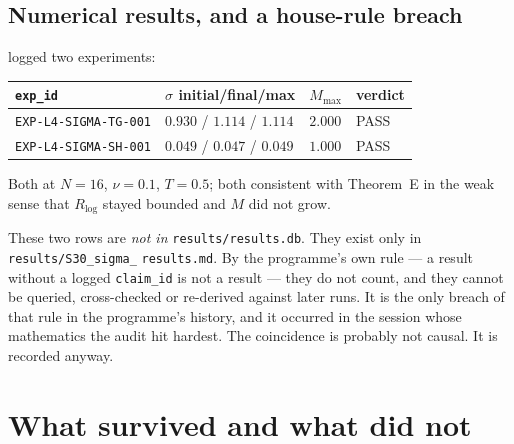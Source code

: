 \subsection{Numerical results, and a house-rule breach}

 logged two experiments:

\begin{center}
\small
\begin{tabular}{@{}l l l l@{}}
\toprule
\texttt{exp\_id} & \(\sigma\) initial/final/max & \(M_{\max}\) & verdict \\
\midrule
\texttt{EXP-L4-SIGMA-TG-001} & \(0.930\) / \(1.114\) / \(1.114\) & \(2.000\) & \textsf{PASS} \\
\texttt{EXP-L4-SIGMA-SH-001} & \(0.049\) / \(0.047\) / \(0.049\) & \(1.000\) & \textsf{PASS} \\
\bottomrule
\end{tabular}
\end{center}

\medskip
Both at \(N=16\), \(\nu=0.1\), \(T=0.5\); both consistent with Theorem~E in
the weak sense that \(R_{\log}\) stayed bounded and \(M\) did not grow.

These two rows are \emph{not in} \texttt{results/}\allowbreak\texttt{results.db}.
They exist only in \texttt{results/}\allowbreak\texttt{S30\_sigma\_}\allowbreak
\texttt{results.md}. By the programme's own rule --- a
result without a logged \texttt{claim\_id} is not a result --- they do not
count, and they cannot be queried, cross-checked or re-derived against later
runs. It is the only breach of that rule in the programme's history, and it
occurred in the session whose mathematics the audit hit hardest. The
coincidence is probably not causal. It is recorded anyway.

\section{What survived and what did not}
\label{sec:prize-survived}

